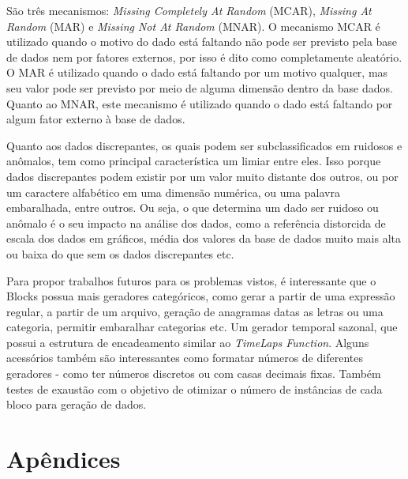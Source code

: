 \documentclass[
	12pt,				%
	openright,			%
	oneside,			%
	a4paper,			%
	english,			%
	brazil				%
	]{abntex2}
\begin{document}
São três mecanismos: \emph{Missing Completely At Random} (MCAR), \emph{Missing At Random} (MAR) e \emph{Missing Not At Random} (MNAR).
O mecanismo MCAR é utilizado quando o motivo do dado está faltando não pode ser previsto pela base de dados nem por fatores externos, por isso é dito como completamente aleatório.
O MAR é utilizado quando o dado está faltando por um motivo qualquer, mas seu valor pode ser previsto por meio de alguma dimensão dentro da base dados.
Quanto ao MNAR, este mecanismo é utilizado quando o dado está faltando por algum fator externo à base de dados.
\par
Quanto aos dados discrepantes, os quais podem ser subclassificados em ruidosos e anômalos, tem como principal característica um limiar entre eles.
Isso porque dados discrepantes podem existir por um valor muito distante dos outros, ou por um caractere alfabético em uma dimensão numérica, ou uma palavra embaralhada, entre outros.
Ou seja, o que determina um dado ser ruidoso ou anômalo é o seu impacto na análise dos dados, como a referência distorcida de escala dos dados em gráficos, média dos valores da base de dados muito mais alta ou baixa do que sem os dados discrepantes etc.
\par
Para propor trabalhos futuros para os problemas vistos, é interessante que o Blocks possua mais geradores categóricos, como gerar a partir de uma expressão regular, a partir de um arquivo, geração de anagramas datas as letras ou uma categoria, permitir embaralhar categorias etc.
Um gerador temporal sazonal, que possui a estrutura de encadeamento similar ao \emph{TimeLaps Function}.
Alguns acessórios também são interessantes como formatar números de diferentes geradores - como ter números discretos ou com casas decimais fixas.
Também testes de exaustão com o objetivo de otimizar o número de instâncias de cada bloco para geração de dados. 
\par

\postextual





\part*{Apêndices} %
\end{document}
